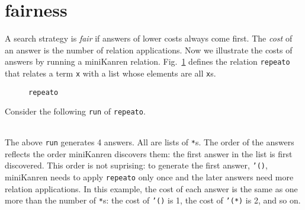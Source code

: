 \documentclass[format=acmlarge, review=true, authordraft=true]{acmart}
\begin{document}



\section{fairness}


A search strategy is \emph{fair} if answers of lower costs always come first. 
The \emph{cost} of an answer is the number of relation applications. Now we 
illustrate the costs of answers by running a miniKanren relation. 
Fig.~\ref{def-repeato} defines the relation \texttt{repeato} that relates a term 
\texttt{x} with a list whose elements are all \texttt{x}s.


\begin{figure}
  
  \caption{\texttt{repeato}}
  \label{def-repeato}
\end{figure}

Consider the following \texttt{run} of \texttt{repeato}.
\begin{center}
  \begin{tabular}{c}
  
   \end{tabular}
\end{center}

The above \texttt{run} generates 4 answers. All are lists of \texttt{*}s.
The order of the answers reflects the order miniKanren discovers them:
the first answer in the list is first discovered. This order is not suprising:
to generate the first answer, \texttt{'()}, miniKanren needs to apply
\texttt{repeato} only once and the later answers need more relation
applications. In this example, the cost of each answer is the same as
one more than the number of \texttt{*}s: the cost of \texttt{'()} is 1,
the cost of \texttt{'(*)} is 2, and so on.
\end{document}
